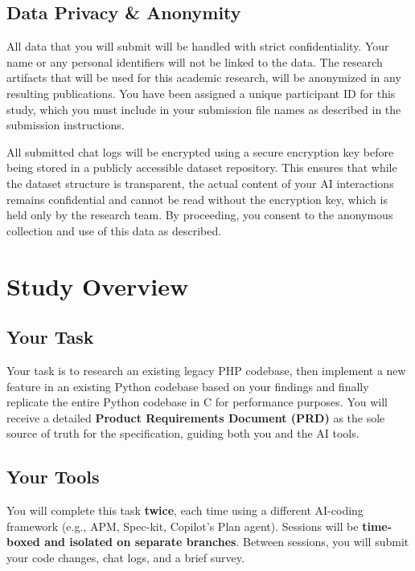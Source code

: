 \documentclass[11pt, a4paper]{article}
\begin{document}
\subsection*{Data Privacy \& Anonymity}
All data that you will submit will be handled with strict confidentiality. Your name or any personal identifiers will not be linked to the data. The research artifacts that will be used for this academic research, will be anonymized in any resulting publications. You have been assigned a unique participant ID for this study, which you must include in your submission file names as described in the submission instructions.\newline

\noindent All submitted chat logs will be encrypted using a secure encryption key before being stored in a publicly accessible dataset repository. This ensures that while the dataset structure is transparent, the actual content of your AI interactions remains confidential and cannot be read without the encryption key, which is held only by the research team. By proceeding, you consent to the anonymous collection and use of this data as described.



\section{Study Overview}

\subsection{Your Task}

Your task is to research an existing legacy PHP codebase, then implement a new feature in an existing Python codebase based on your findings and finally replicate the entire Python codebase in C for performance purposes. You will receive a detailed \textbf{Product Requirements Document (PRD)} as the sole source of truth for the specification, guiding both you and the AI tools.

\subsection{Your Tools}

You will complete this task \textbf{twice}, each time using a different AI-coding framework (e.g., APM, Spec-kit, Copilot's Plan agent). Sessions will be \textbf{time-boxed and isolated on separate branches}. Between sessions, you will submit your code changes, chat logs, and a brief survey.
\end{document}
